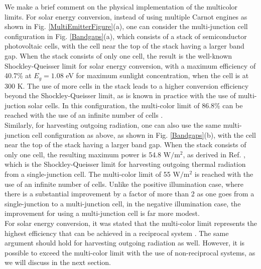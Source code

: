 \documentclass[notitlepage,onecolumn,aps,showpacs,preprintnumbers,amsmath,amssymb,superscriptaddress]{revtex4-1}
\begin{document}
We make a brief comment on the physical implementation of the multicolor limits. For solar energy conversion, instead of using multiple Carnot engines as shown in Fig. \ref{MultiEmitterFigure}(a), one can consider the multi-junction cell configuration in Fig. \ref{Bandgaps}(a), which consists of a stack of semiconductor photovoltaic cells, with the cell near the top of the stack having a larger band gap. When the stack consists of only one cell, the result is the well-known Shockley-Queisser limit \citep{shockleyqueisser} for solar energy conversion, with a maximum efficiency of 40.7\% at $E_g = 1.08$ eV for maximum sunlight concentration, when the cell is at 300 K. The use of more cells in the stack leads to a higher conversion efficiency beyond the Shockley-Queisser limit, as is known in practice with the use of multi-juction solar cells. In this configuration, the multi-color limit of 86.8\% can be reached with the use of an infinite number of cells \citep{marti, browngreen}.\\ 

Similarly, for harvesting outgoing radiation, one can also use the same multi-junction cell configuration as above, as shown in Fig. \ref{Bandgaps}(b), with the cell near the top of the stack having a larger band gap. When the stack consists of only one cell, the resulting maximum power is 54.8 $\mathrm{W/m^2}$, as derived in Ref. \citep{parthi}, which is the Shockley-Queisser limit for harvesting outgoing thermal radiation from a single-junction cell. The multi-color limit of 55 $\mathrm{W/m^2}$ is reached with the use of an infinite number of cells. Unlike the positive illumination case, where there is a substantial improvement by a factor of more than 2 as one goes from a single-junction to a multi-junction cell, in the negative illumination case, the improvement for using a multi-junction cell is far more modest. \\

For solar energy conversion, it was stated that the multi-color limit represents the highest efficiency that can be achieved in a reciprocal system \citep{greenconf}. The same argument should hold for harvesting outgoing radiation as well. However, it is possible to exceed the multi-color limit with the use of non-reciprocal systems, as we will discuss in the next section.  
\end{document}
